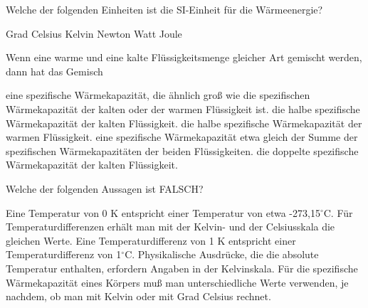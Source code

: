 \documentclass[11pt]{exam}
\begin{document}
\setlength{\voffset}{-0.5in}
\setlength{\headsep}{5pt}

\hspace{2mm}
 \hspace{5mm}
\vspace{4mm}

\begin{questions}

\question Welche der folgenden Einheiten ist die SI-Einheit für die Wärmeenergie?

\begin{choices}
	\choice Grad Celsius
	\choice Kelvin
	\choice Newton
	\choice Watt
	\choice Joule
\end{choices}

\vspace{3mm}\question Wenn eine warme und eine kalte Flüssigkeitsmenge gleicher Art gemischt werden, dann hat das Gemisch

\begin{choices}
	\choice eine spezifische Wärmekapazität, die ähnlich groß wie die spezifischen Wärmekapazität der kalten oder der warmen Flüssigkeit ist.
	\choice die halbe spezifische Wärmekapazität der kalten Flüssigkeit.
	\choice die halbe spezifische Wärmekapazität der warmen Flüssigkeit.
	\choice eine spezifische Wärmekapazität etwa gleich der Summe der spezifischen Wärmekapazitäten der beiden Flüssigkeiten.
	\choice die doppelte spezifische Wärmekapazität der kalten Flüssigkeit.
\end{choices}

\vspace{3mm}\question Welche der folgenden Aussagen ist FALSCH?

\begin{choices}
	\choice Eine Temperatur von 0 K entspricht einer Temperatur von etwa -273,15\(^\circ\)C.
	\choice Für Temperaturdifferenzen erhält man mit der Kelvin- und der Celsiusskala die gleichen Werte.
	\choice Eine Temperaturdifferenz von 1 K entspricht einer Temperaturdifferenz von 1\(^\circ\)C.
	\choice Physikalische Ausdrücke, die die absolute Temperatur enthalten, erfordern Angaben in der Kelvinskala.
	\choice Für die spezifische Wärmekapazität eines Körpers muß man unterschiedliche Werte verwenden, je nachdem, ob man mit Kelvin oder mit Grad Celsius rechnet.
\end{choices}


\end{questions}
\end{document}

